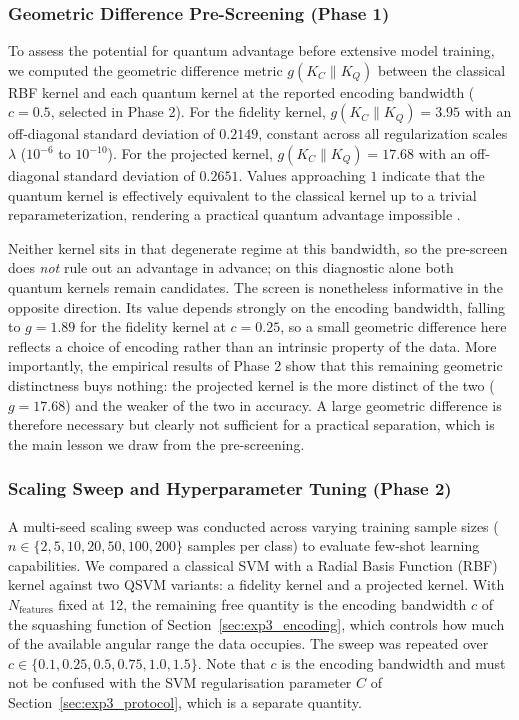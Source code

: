 \subsubsection{Geometric Difference Pre-Screening (Phase 1)}
To assess the potential for quantum advantage before extensive model training, we computed
the geometric difference metric $g(K_C \| K_Q)$ between the classical RBF kernel and each
quantum kernel at the reported encoding bandwidth ($c = 0.5$, selected in Phase 2). For the
fidelity kernel, $g(K_C \| K_Q) = 3.95$ with an off-diagonal standard deviation of
$0.2149$, constant across all regularization scales $\lambda$ ($10^{-6}$ to $10^{-10}$).
For the projected kernel, $g(K_C \| K_Q) = 17.68$ with an off-diagonal standard deviation
of $0.2651$. Values approaching $1$ indicate that the quantum kernel is effectively
equivalent to the classical kernel up to a trivial reparameterization, rendering a
practical quantum advantage impossible \cite{huang2021power}.

Neither kernel sits in that degenerate regime at this bandwidth, so the pre-screen does
\emph{not} rule out an advantage in advance; on this diagnostic alone both quantum kernels
remain candidates. The screen is nonetheless informative in the opposite direction. Its
value depends strongly on the encoding bandwidth, falling to $g = 1.89$ for the fidelity
kernel at $c = 0.25$, so a small geometric difference here reflects a choice of encoding
rather than an intrinsic property of the data. More importantly, the empirical results of
Phase 2 show that this remaining geometric distinctness buys nothing: the projected kernel
is the more distinct of the two ($g = 17.68$) and the weaker of the two in accuracy. A
large geometric difference is therefore necessary but clearly not sufficient for a
practical separation, which is the main lesson we draw from the pre-screening.

\subsubsection{Scaling Sweep and Hyperparameter Tuning (Phase 2)}
A multi-seed scaling sweep was conducted across varying training sample sizes ($n \in \{2, 5, 10, 20, 50, 100, 200\}$ samples per class) to evaluate few-shot learning capabilities. We compared a classical SVM with a Radial Basis Function (RBF) kernel against two QSVM variants: a fidelity kernel and a projected kernel. With $N_{\text{features}}$ fixed at 12, the remaining free quantity is the encoding bandwidth $c$ of the squashing function of Section~\ref{sec:exp3_encoding}, which controls how much of the available angular range the data occupies. The sweep was repeated over $c \in \{0.1, 0.25, 0.5, 0.75, 1.0, 1.5\}$. Note that $c$ is the encoding bandwidth and must not be confused with the SVM regularisation parameter $C$ of Section~\ref{sec:exp3_protocol}, which is a separate quantity.

